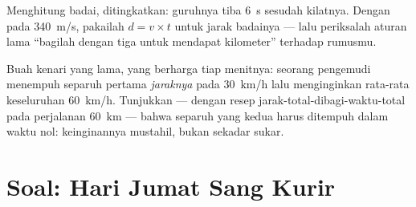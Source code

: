 \begin{exercise}[$\star\star$]\label{exo:g7:motion-average-speed:11}
Menghitung badai, ditingkatkan: guruhnya tiba \qty{6}{s} sesudah
kilatnya. Dengan  pada \qty{340}{m/s}, pakailah $d = v \times t$
untuk jarak badainya --- lalu periksalah aturan lama ``bagilah dengan
tiga untuk mendapat kilometer'' terhadap rumusmu.
\end{exercise}

\begin{exercise}[$\star\star\star$]\label{exo:g7:motion-average-speed:12}
Buah kenari yang lama, yang berharga tiap menitnya: seorang pengemudi
menempuh separuh pertama \emph{jaraknya} pada \qty{30}{km/h} lalu
menginginkan rata-rata keseluruhan \qty{60}{km/h}. Tunjukkan --- dengan
resep jarak-total-dibagi-waktu-total pada perjalanan \qty{60}{km} ---
bahwa separuh yang kedua harus ditempuh dalam waktu nol: keinginannya
mustahil, bukan sekadar sukar.
\end{exercise}

\section{Soal: Hari Jumat Sang Kurir}

